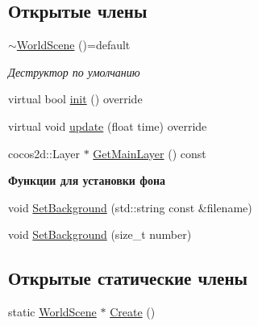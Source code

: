 \subsection*{Открытые члены}
\begin{DoxyCompactItemize}
\item 
\mbox{\label{classrtm_1_1_world_scene_a0e7f98986330555b5fcecf218915e623}} 
\hyperlink{classrtm_1_1_world_scene_a0e7f98986330555b5fcecf218915e623}{$\sim$\+World\+Scene} ()=default
\begin{DoxyCompactList}\small\item\em Деструктор по умолчанию \end{DoxyCompactList}\item 
virtual bool \hyperlink{classrtm_1_1_world_scene_a53da1782e50b99e90831bceb54c69ab9}{init} () override
\item 
virtual void \hyperlink{classrtm_1_1_world_scene_a243c2d00cc0e525738b099eea7120fba}{update} (float time) override
\item 
cocos2d\+::\+Layer $\ast$ \hyperlink{classrtm_1_1_world_scene_a33b06df7f231db363d6894408e16e225}{Get\+Main\+Layer} () const
\end{DoxyCompactItemize}
\begin{Indent}\textbf{ Функции для установки фона}\par
\begin{DoxyCompactItemize}
\item 
void \hyperlink{classrtm_1_1_world_scene_accf4ad079366ad6ca9731bff83d937c0}{Set\+Background} (std\+::string const \&filename)
\item 
void \hyperlink{classrtm_1_1_world_scene_a097fa828c003f8757faf1aebdd0e63f1}{Set\+Background} (size\+\_\+t number)
\end{DoxyCompactItemize}
\end{Indent}
\subsection*{Открытые статические члены}
\begin{DoxyCompactItemize}
\item 
static \hyperlink{classrtm_1_1_world_scene}{World\+Scene} $\ast$ \hyperlink{classrtm_1_1_world_scene_a4d9c6dcf1fc6a02c1d090caed0ad6745}{Create} ()
\end{DoxyCompactItemize}
